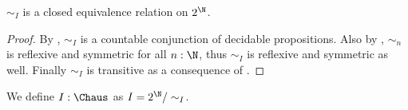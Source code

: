 \begin{corollary}
  $\sim_I$ is a closed equivalence relation on $2^\N$. 
\end{corollary}
\begin{proof}
  By , $\sim_I$ is a countable conjunction of decidable propositions. 
  Also by , $\sim_n$ is reflexive and symmetric for all $n:\N$, thus
  $\sim_I$ is reflexive and symmetric as well. 
  Finally $\sim_I$ is transitive as a consequence of .
\end{proof}
\begin{definition}
  We define $I:\Chaus$ as $I= 2^\N/\sim_I$. 
\end{definition}
